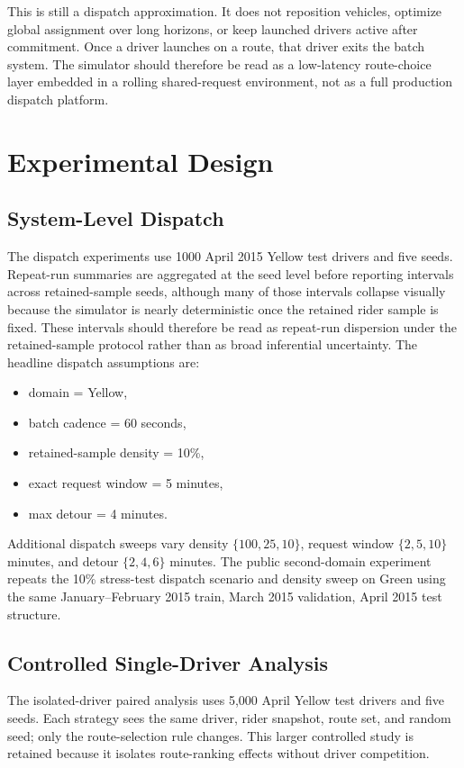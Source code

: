 \documentclass[journal]{IEEEtran}
\begin{document}
This is still a dispatch approximation. It does not reposition vehicles, optimize global assignment over long horizons, or keep launched drivers active after commitment. Once a driver launches on a route, that driver exits the batch system. The simulator should therefore be read as a low-latency route-choice layer embedded in a rolling shared-request environment, not as a full production dispatch platform.

\section{Experimental Design}
\subsection{System-Level Dispatch}
The dispatch experiments use 1000 April 2015 Yellow test drivers and five seeds. Repeat-run summaries are aggregated at the seed level before reporting intervals across retained-sample seeds, although many of those intervals collapse visually because the simulator is nearly deterministic once the retained rider sample is fixed. These intervals should therefore be read as repeat-run dispersion under the retained-sample protocol rather than as broad inferential uncertainty. The headline dispatch assumptions are:
\begin{itemize}
    \item domain = Yellow,
    \item batch cadence = 60 seconds,
    \item retained-sample density = 10\%,
    \item exact request window = 5 minutes,
    \item max detour = 4 minutes.
\end{itemize}

Additional dispatch sweeps vary density \(\{100,25,10\}\), request window \(\{2,5,10\}\) minutes, and detour \(\{2,4,6\}\) minutes. The public second-domain experiment repeats the 10\% stress-test dispatch scenario and density sweep on Green using the same January--February 2015 train, March 2015 validation, April 2015 test structure.

\subsection{Controlled Single-Driver Analysis}
The isolated-driver paired analysis uses 5{,}000 April Yellow test drivers and five seeds. Each strategy sees the same driver, rider snapshot, route set, and random seed; only the route-selection rule changes. This larger controlled study is retained because it isolates route-ranking effects without driver competition.
\end{document}
